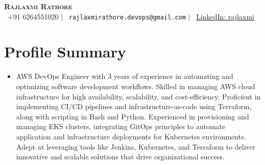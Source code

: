 \documentclass[a4paper,10pt]{article}
\newcommand{\resumeItem}[1]{
  \item\small{
    {#1 \vspace{-2pt}}
  }
}
\newcommand{\resumeSubHeadingListStart}{\begin{itemize}[leftmargin=0.15in, label={}]}
\newcommand{\resumeSubHeadingListEnd}{\end{itemize}}
\begin{document}
\begin{center}
  \textbf{\Huge \scshape Rajlaxmi Rathore} \\ \vspace{1pt}
  \small
  \textcolor{NavyBlue}{
    \faPhone\ +91 6264551020 $|$ 
    \faEnvelope\ \nolinkurl{rajlaxmirathore.devops@gmail.com} $|$ 
    \faLinkedinSquare\ \href{https://www.linkedin.com/in/rajlaxmi29/}{LinkedIn: rajlaxmi}
  }
\end{center}

\section{Profile Summary}
\resumeSubHeadingListStart
  \resumeItem{
   AWS DevOps Engineer with 3 years of experience in automating and optimizing software development workflows. Skilled in managing AWS cloud infrastructure for high availability, scalability, and cost-efficiency. Proficient in implementing CI/CD pipelines and infrastructure-as-code using Terraform, along with scripting in Bash and Python. Experienced in provisioning and managing EKS clusters, integrating GitOps principles to automate application and infrastructure deployments for Kubernetes environments. Adept at leveraging tools like Jenkins, Kubernetes, and Terraform to deliver innovative and scalable solutions that drive organizational success.
  }
\resumeSubHeadingListEnd

\end{document}
